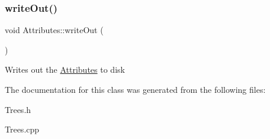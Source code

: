 \subsubsection{\texorpdfstring{write\+Out()}{writeOut()}}
{\footnotesize\ttfamily void Attributes\+::write\+Out (\begin{DoxyParamCaption}{ }\end{DoxyParamCaption})}

Writes out the \mbox{\hyperlink{classAttributes}{Attributes}} to disk 

The documentation for this class was generated from the following files\+:\begin{DoxyCompactItemize}
\item 
Trees.\+h\item 
Trees.\+cpp\end{DoxyCompactItemize}
